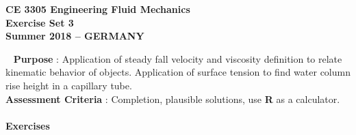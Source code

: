 \documentclass[12pt]{article}
\begin{document}
\begingroup
\begin{center}
{\textbf{{ CE 3305 Engineering Fluid Mechanics} \\ Exercise Set 3 \\ Summer 2018 -- GERMANY} }
\end{center}
\endgroup
\begingroup
~\newline
\textbf{Purpose} :  Application of steady fall velocity and viscosity definition to relate kinematic behavior of objects.  Application of surface tension to find water column rise height in a capillary tube. \\
\textbf{Assessment Criteria} : Completion, plausible solutions, use \textbf{R} as a calculator. \\~\\
\textbf{Exercises}
\end{document}
